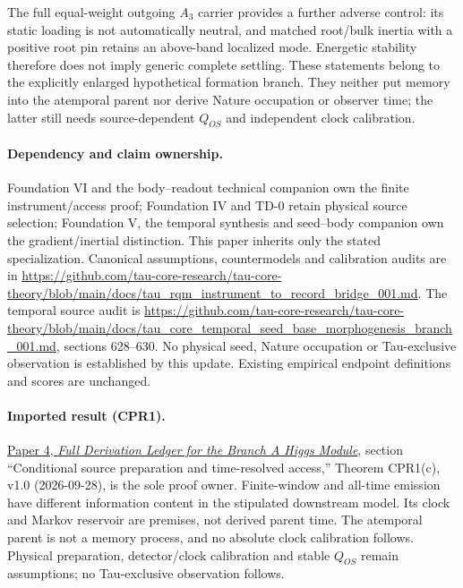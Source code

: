 \documentclass[11pt]{article}
\begin{document}
The full equal-weight outgoing $A_3$ carrier provides a further adverse
control: its static loading is not automatically neutral, and matched
root/bulk inertia with a positive root pin retains an above-band localized
mode. Energetic stability therefore does not imply generic complete settling.
These statements belong to the explicitly enlarged hypothetical formation
branch. They neither put memory into the atemporal parent nor derive Nature
occupation or observer time; the latter still needs source-dependent
$Q_{OS}$ and independent clock calibration.

\paragraph{Dependency and claim ownership.}
Foundation VI and the body--readout technical companion own the finite instrument/access proof; Foundation IV and TD-0 retain physical source selection; Foundation V, the temporal synthesis and seed--body companion own the gradient/inertial distinction. This paper inherits only the stated specialization. Canonical assumptions, countermodels and calibration audits are in \url{https://github.com/tau-core-research/tau-core-theory/blob/main/docs/tau_rqm_instrument_to_record_bridge_001.md}. The temporal source audit is \url{https://github.com/tau-core-research/tau-core-theory/blob/main/docs/tau_core_temporal_seed_base_morphogenesis_branch_001.md}, sections 628--630. No physical seed, Nature occupation or Tau-exclusive observation is established by this update. Existing empirical endpoint definitions and scores are unchanged.

\paragraph{Imported result (CPR1).}
\href{https://github.com/tau-core-research/tau-core-higgs-module-paper4/blob/main/paper4_full_derivation/full_derivation.pdf#nameddest=cpr1}{Paper 4, \emph{Full Derivation Ledger for the Branch A Higgs Module}}, section ``Conditional source preparation and time-resolved access,'' Theorem CPR1(c), v1.0 (2026-09-28), is the sole proof owner.
Finite-window and all-time emission have different information content in the stipulated downstream model. Its clock and Markov reservoir are premises, not derived parent time. The atemporal parent is not a memory process, and no absolute clock calibration follows.
Physical preparation, detector/clock calibration and stable $Q_{OS}$ remain assumptions; no Tau-exclusive observation follows.
\end{document}
